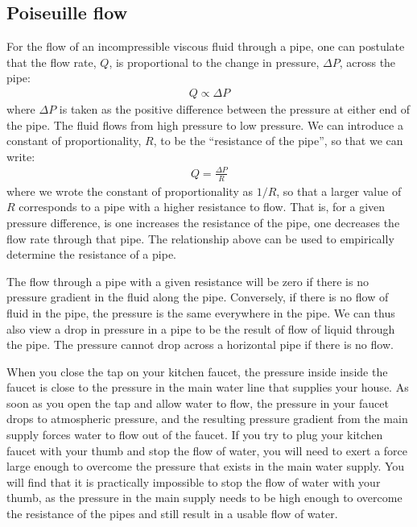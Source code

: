 {{\subsection{Poiseuille flow}
For the flow of an incompressible viscous fluid through a pipe, one can postulate that the flow rate, $Q$, is proportional to the change in pressure, $\Delta P$, across the pipe:
\begin{align*}
Q \propto \Delta P
\end{align*}
where $\Delta P$ is taken as the positive difference between the pressure at either end of the pipe. The fluid flows from high pressure to low pressure. We can introduce a constant of proportionality, $R$, to be the ``resistance of the pipe'', so that we can write:
\begin{align*}
Q = \frac{\Delta P}{R} 
\end{align*}
where we wrote the constant of proportionality as $1/R$, so that a larger value of $R$ corresponds to a pipe with a higher resistance to flow. That is, for a given pressure difference, is one increases the resistance of the pipe, one decreases the flow rate through that pipe. The relationship above can be used to empirically determine the resistance of a pipe.

The flow through a pipe with a given resistance will be zero if there is no pressure gradient in the fluid along the pipe. Conversely, if there is no flow of fluid in the pipe, the pressure is the same everywhere in the pipe. We can thus also view a drop in pressure in a pipe to be the result of flow of liquid through the pipe. The pressure cannot drop across a horizontal pipe if there is no flow.

When you close the tap on your kitchen faucet, the pressure inside inside the faucet is close to the pressure in the main water line that supplies your house. As soon as you open the tap and allow water to flow, the pressure in your faucet drops to atmospheric pressure, and the resulting pressure gradient from the main supply forces water to flow out of the faucet. If you try to plug your kitchen faucet with your thumb and stop the flow of water, you will need to exert a force large enough to overcome the pressure that exists in the main water supply. You will find that it is practically impossible to stop the flow of water with your thumb, as the pressure in the main supply needs to be high enough to overcome the resistance of the pipes and still result in a usable flow of water. 

}}
